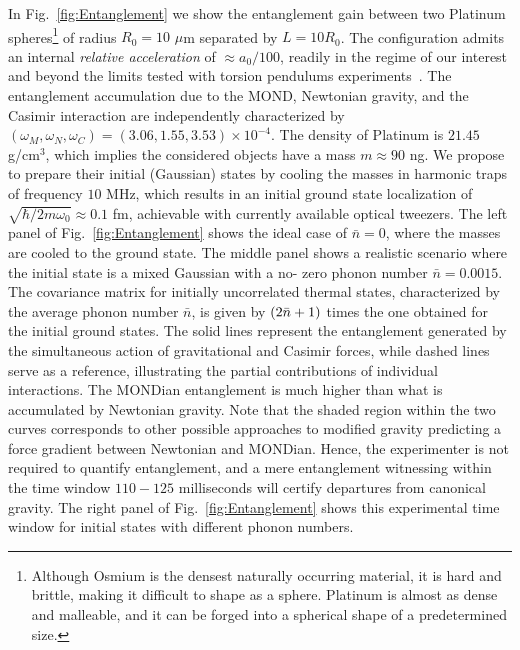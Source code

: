 \documentclass[aps,prd,reprint,superscriptaddress,nofootinbib,floatfix]{revtex4-2}
\begin{document}
In Fig.~\ref{fig:Entanglement} we show the entanglement gain between two Platinum spheres\footnote{Although Osmium is the densest naturally occurring material, it is hard and brittle, making it difficult to shape as a sphere. Platinum is almost as dense and malleable, and it can be forged into a spherical shape of a predetermined size.}
of radius $R_0 = 10$ $\mu$m separated by $L = 10R_0$. 
The configuration admits an internal \emph{relative acceleration} of $\approx a_0/100$, readily in the regime of our interest and beyond the limits tested with torsion pendulums experiments~\cite{TestNewton-Little2014}. 
The entanglement accumulation due to the MOND, Newtonian gravity, and the Casimir interaction are independently characterized by 
$(\omega_M,\omega_N,\omega_C) = (3.06,1.55,3.53) \times 10^{-4}$.
The density of Platinum is $21.45$ g/cm$^3$, which implies the considered objects have a mass $m \approx 90$ ng.
We propose to prepare their initial (Gaussian) states by cooling the masses in harmonic traps of frequency $10$ MHz, which results in an initial ground state localization of  $\sqrt{\hbar/2m\omega_0} \approx 0.1$ fm, achievable with currently available optical tweezers.
The left panel of Fig.~\ref{fig:Entanglement} shows the ideal case of $\bar{n} = 0$, where the masses are cooled to the ground state. The middle panel shows a realistic scenario where the initial state is a mixed Gaussian with a no- zero phonon number $\bar n = 0.0015$. 
The covariance matrix for initially uncorrelated thermal states, characterized by the average phonon number $\bar{n}$, is given by $\qty(2\bar{n}+1)$ times the one obtained for the initial ground states.
The solid lines represent the entanglement generated by the simultaneous action of gravitational and Casimir forces, while dashed lines serve as a reference, illustrating the partial contributions of individual interactions.
The MONDian entanglement is much higher than what is accumulated by Newtonian gravity.
Note that the shaded region within the two curves corresponds to other possible approaches to modified gravity predicting a force gradient between Newtonian and MONDian.
Hence, the experimenter is not required to quantify entanglement, and a mere entanglement witnessing within the time window $110-125$ milliseconds will certify departures from canonical gravity. 
The right panel of Fig.~\ref{fig:Entanglement} shows this experimental time window for initial states with different phonon numbers.
\end{document}
